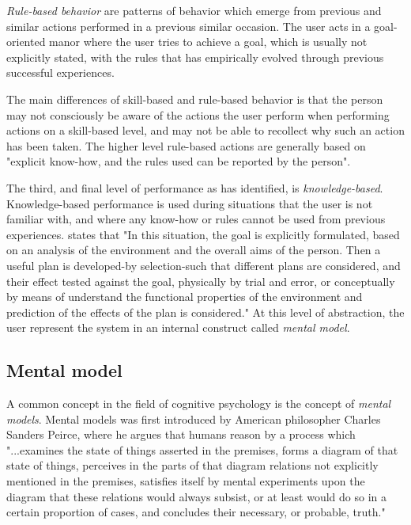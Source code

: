 \textit{Rule-based behavior} are patterns of behavior which emerge from previous and similar actions performed in a previous similar occasion. The user acts in a goal-oriented manor where the user tries to achieve a goal, which is usually not explicitly stated, with the rules that has empirically evolved through previous successful experiences. 

The main differences of skill-based and rule-based behavior is that the person may not consciously be aware of the actions the user perform when performing actions on a skill-based level, and may not be able to recollect why such an action has been taken. The higher level rule-based actions are generally based on "explicit know-how, and the rules used can be reported by the person".

The third, and final level of performance as \cite{Rasmussen1983} has identified, is \textit{knowledge-based}. Knowledge-based performance is used during situations that the user is not familiar with, and where any know-how or rules cannot be used from previous experiences. \cite{Rasmussen1983} states that "In this situation, the goal is explicitly formulated, based on an analysis of the environment and the overall aims of the person. Then a useful plan is developed-by selection-such that different plans are considered, and their effect tested against the goal, physically by trial and error, or conceptually by means of understand the functional properties of the environment and prediction of the effects of the plan is considered." At this level of abstraction, the user represent the system in an internal construct called \textit{mental model}.


\subsection{Mental model}
A common concept in the field of cognitive psychology is the concept of \textit{mental models}. Mental models was first introduced by American philosopher Charles Sanders Peirce, where he argues that humans reason by a process which
"...examines the state of things
asserted in the premises, forms a diagram of that state of things, perceives in the parts of that diagram relations not explicitly mentioned in the premises, satisfies itself by mental experiments upon the diagram that these relations would always subsist, or at least would do so in a certain proportion of cases, and concludes their necessary, or probable, truth." \cite{Pierce1974}

